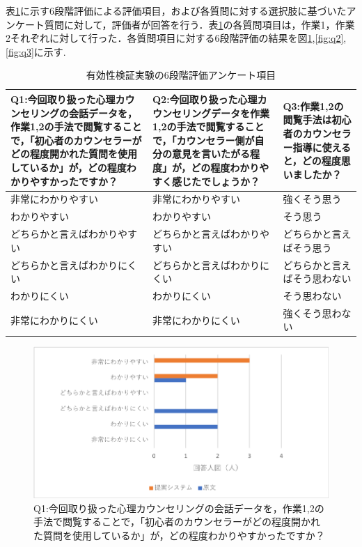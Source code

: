 \documentclass[shuuron]{kuee}
\begin{document}
表\ref{table:genbunAnke}に示す6段階評価による評価項目，および各質問に対する選択肢に基づいたアンケート質問に対して，評価者が回答を行う．表\ref{table:genbunAnke}の各質問項目は，作業1，作業2それぞれに対して行った．各質問項目に対する6段階評価の結果を図\ref{fig:q1},\ref{fig:q2},\ref{fig:q3}に示す.

\begin{table}
  \caption{有効性検証実験の6段階評価アンケート項目}
  \label{table:genbunAnke}
  \begin{center}
    \begin{tabular}{|p{4cm}|p{4cm}|p{4cm}|} \hline
      Q1:今回取り扱った心理カウンセリングの会話データを，作業1,2の手法で閲覧することで，「初心者のカウンセラーがどの程度開かれた質問を使用しているか」が，どの程度わかりやすかったですか？ & Q2:今回取り扱った心理カウンセリングデータを作業1,2の手法で閲覧することで，「カウンセラー側が自分の意見を言いたがる程度」が，どの程度わかりやすく感じたでしょうか？ & Q3:作業1,2の閲覧手法は初心者のカウンセラー指導に使えると，どの程度思いましたか？
      \\ \hline
       非常にわかりやすい & 非常にわかりやすい & 強くそう思う
      \\ \hline
      わかりやすい & わかりやすい & そう思う
      \\ \hline
      どちらかと言えばわかりやすい & どちらかと言えばわかりやすい & どちらかと言えばそう思う
      \\ \hline
      どちらかと言えばわかりにくい & どちらかと言えばわかりにくい & どちらかと言えばそう思わない
      \\ \hline
      わかりにくい & わかりにくい & そう思わない
      \\ \hline
      非常にわかりにくい & 非常にわかりにくい & 強くそう思わない
      \\ \hline
    \end{tabular}
  \end{center}
\end{table}

\begin{figure}
  \begin{center}
    \includegraphics[width=\linewidth]{q1.png}
  \end{center}
  \caption{Q1:今回取り扱った心理カウンセリングの会話データを，作業1,2の手法で閲覧することで，「初心者のカウンセラーがどの程度開かれた質問を使用しているか」が，どの程度わかりやすかったですか？}
  \label{fig:q1}
\end{figure}
\end{document}

